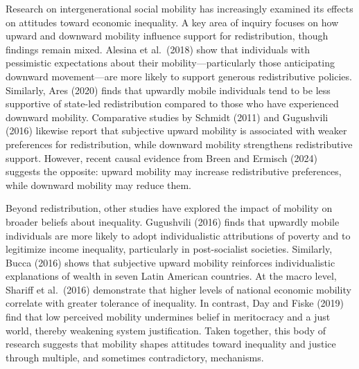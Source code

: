 \documentclass[
  12pt,
]{article}
\begin{document}
Research on intergenerational social mobility has increasingly examined
its effects on attitudes toward economic inequality. A key area of
inquiry focuses on how upward and downward mobility influence support
for redistribution, though findings remain mixed. Alesina et al.~(2018)
show that individuals with pessimistic expectations about their
mobility---particularly those anticipating downward movement---are more
likely to support generous redistributive policies. Similarly, Ares
(2020) finds that upwardly mobile individuals tend to be less supportive
of state-led redistribution compared to those who have experienced
downward mobility. Comparative studies by Schmidt (2011) and Gugushvili
(2016) likewise report that subjective upward mobility is associated
with weaker preferences for redistribution, while downward mobility
strengthens redistributive support. However, recent causal evidence from
Breen and Ermisch (2024) suggests the opposite: upward mobility may
increase redistributive preferences, while downward mobility may reduce
them.

Beyond redistribution, other studies have explored the impact of
mobility on broader beliefs about inequality. Gugushvili (2016) finds
that upwardly mobile individuals are more likely to adopt
individualistic attributions of poverty and to legitimize income
inequality, particularly in post-socialist societies. Similarly, Bucca
(2016) shows that subjective upward mobility reinforces individualistic
explanations of wealth in seven Latin American countries. At the macro
level, Shariff et al.~(2016) demonstrate that higher levels of national
economic mobility correlate with greater tolerance of inequality. In
contrast, Day and Fiske (2019) find that low perceived mobility
undermines belief in meritocracy and a just world, thereby weakening
system justification. Taken together, this body of research suggests
that mobility shapes attitudes toward inequality and justice through
multiple, and sometimes contradictory, mechanisms.
\end{document}
